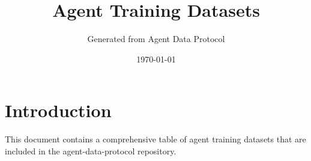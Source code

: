 \documentclass[11pt]{article}
\title{Agent Training Datasets}
\author{Generated from Agent Data Protocol}
\date{\today}
\begin{document}
\maketitle

\section{Introduction}

This document contains a comprehensive table of agent training datasets that are included in the agent-data-protocol repository.





\end{document}

